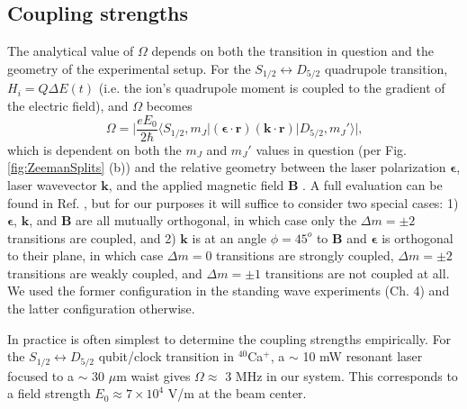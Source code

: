 \subsection{Coupling strengths}
The analytical value of $\Omega$ depends on both the transition in question and the geometry of the experimental setup. For the $S_{1/2} \leftrightarrow D_{5/2}$ quadrupole transition, $H_i = \hat{Q} \Delta E(t)$ (i.e. the ion's quadrupole moment is coupled to the gradient of the electric field), and $\Omega$ becomes
\begin{equation}
\Omega =  \bigg| \frac{e E_0}{2 \hbar} \langle S_{1/2}, m_J | (\mathbf{\epsilon \cdot r})(\mathbf{k \cdot r}) | D_{5/2}, m_J' \rangle \bigg| \text{,}
\end{equation}
which is dependent on both the $m_J$ and $m_J'$ values in question (per Fig. \ref{fig:ZeemanSplits} (b)) and the relative geometry between the laser polarization $\mathbf{\epsilon}$, laser wavevector $\mathbf{k}$, and the applied magnetic field $\mathbf{B}$ \cite{James98.APB.66.181, Roos00.Thesis}. A full evaluation can be found in Ref. \cite{Roos00.Thesis}, but for our purposes it will suffice to consider two special cases: 1) $\mathbf{\epsilon}$, $\mathbf{k}$, and $\mathbf{B}$ are all mutually orthogonal, in which case only the $\Delta m = \pm 2$ transitions are coupled, and 2) $\mathbf{k}$ is at an angle $\phi = 45^o$ to $\mathbf{B}$ and $\mathbf{\epsilon}$ is orthogonal to their plane, in which case $\Delta m = 0$ transitions are strongly coupled, $\Delta m = \pm2$ transitions are weakly coupled, and $\Delta m = \pm1$ transitions are not coupled at all. We used the former configuration in the standing wave experiments (Ch. 4) and the latter configuration otherwise. 

In practice is often simplest to determine the coupling strengths empirically. For the $S_{1/2} \leftrightarrow D_{5/2}$ qubit/clock transition in $^{40}$Ca$^+$, a $\sim$ 10 mW resonant laser focused to a $\sim$ 30 $\mu$m waist gives $\Omega \approx$ 3 MHz in our system. This corresponds to a field strength $E_0 \approx 7 \times 10^4$ V/m at the beam center.



